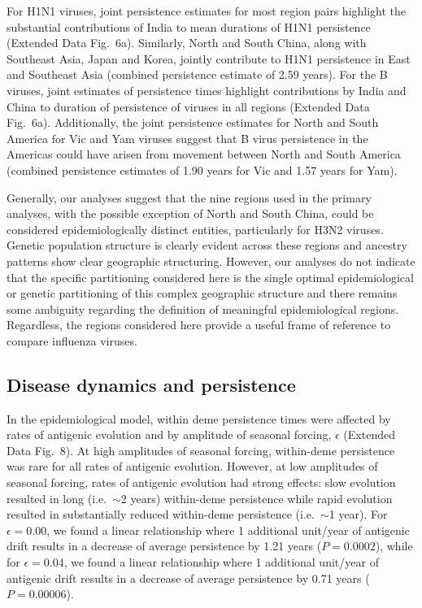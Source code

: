\documentclass[11pt,oneside,letterpaper]{article}
\begin{document}
For H1N1 viruses, joint persistence estimates for most region pairs highlight the substantial contributions of India to mean durations of H1N1 persistence (Extended Data Fig.~6a).
Similarly, North and South China, along with Southeast Asia, Japan and Korea, jointly contribute to H1N1 persistence in East and Southeast Asia (combined persistence estimate of 2.59 years).
For the B viruses, joint estimates of persistence times highlight contributions by India and China to duration of persistence of viruses in all regions (Extended Data Fig.~6a).
Additionally, the joint persistence estimates for North and South America for Vic and Yam viruses suggest that B virus persistence in the Americas could have arisen from movement between North and South America (combined persistence estimates of 1.90 years for Vic and 1.57 years for Yam).

Generally, our analyses suggest that the nine regions used in the primary analyses, with the possible exception of North and South China, could be considered epidemiologically distinct entities, particularly for H3N2 viruses.
Genetic population structure is clearly evident across these regions and ancestry patterns show clear geographic structuring.
However, our analyses do not indicate that the specific partitioning considered here is the single optimal epidemiological or genetic partitioning of this complex geographic structure and there remains some ambiguity regarding the definition of meaningful epidemiological regions.  
Regardless, the regions considered here provide a useful frame of reference to compare influenza viruses.

\subsection*{Disease dynamics and persistence}

In the epidemiological model, within deme persistence times were affected by rates of antigenic evolution and by amplitude of seasonal forcing, $\epsilon$ (Extended Data Fig.~8).
At high amplitudes of seasonal forcing, within-deme persistence was rare for all rates of antigenic evolution.
However, at low amplitudes of seasonal forcing, rates of antigenic evolution had strong effects: slow evolution resulted in long (i.e.\ $\sim$2 years) within-deme persistence while rapid evolution resulted in substantially reduced within-deme persistence (i.e.\ $\sim$1 year).
For $\epsilon = 0.00$, we found a linear relationship where 1 additional unit/year of antigenic drift results in a decrease of average persistence by 1.21 years ($P = 0.0002$), while for $\epsilon = 0.04$, we found a linear relationship where 1 additional unit/year of antigenic drift results in a decrease of average persistence by 0.71 years ($P = 0.00006$).
\end{document}
